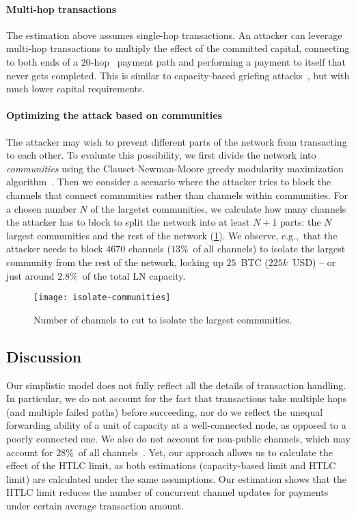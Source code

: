 \paragraph{Multi-hop transactions}
The estimation above assumes single-hop transactions.
An attacker can leverage multi-hop transactions to multiply the effect of the committed capital,
connecting to both ends of a $20$-hop~\cite{Bolt4OnionRouting} payment path and performing a payment 
to itself that never gets completed. 
This is similar to capacity-based griefing attacks~\cite{HerreraJoancomarti2019}, 
but with much lower capital requirements.

\paragraph{Optimizing the attack based on communities}
The attacker may wish to prevent different parts of the network from transacting to each other.
To evaluate this possibility, we first divide the network into \textit{communities} using the Clauset-Newman-Moore greedy modularity maximization algorithm~\cite{Clauset2004}.
Then we consider a scenario where the attacker tries to block the channels that connect communities 
rather than channels within communities.
For a chosen number $N$ of the largetst communities, we calculate how many channels the attacker has to block to split the network into at least $N+1$ parts: the $N$ largest communities and the rest of the network (\cref{fig:isolate-communities}).
We observe, e.g.,~that the attacker needs to block $4670$ channels 
($13\%$~of all channels) to isolate the largest community from the rest of the network, locking up $25$~BTC ($225k$~USD) -- or just around $2.8\%$~of the total LN capacity.

\begin{figure}[tb]
	\centering
	\texttt{[image: isolate-communities]}
	\caption{Number of channels to cut to isolate the largest communities.\label{fig:isolate-communities}}
\end{figure}


\subsection{Discussion}
Our simplistic model does not fully reflect all the details of transaction handling. 
In particular, we do not account for the fact that transactions take multiple hops (and multiple failed paths) before succeeding, nor do we reflect the unequal forwarding ability of a unit of capacity at a well-connected node, 
as opposed to a poorly connected one.
We also do not account for non-public channels, which may account for $28\%$~of all channels~\cite{BitMEXPrivateChannels}.
Yet, our approach allows us to calculate the effect of the HTLC limit,
as both estimations (capacity-based limit and HTLC limit) are calculated under the same assumptions.
Our estimation shows that the HTLC limit reduces the number of concurrent channel updates 
for payments under certain average transaction amount. 

